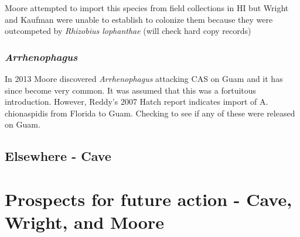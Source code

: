 \documentclass[12pt,letterpaper,english,bibliography=totocnumbered, abstract=on]{scrartcl}
\begin{document}
Moore attempted to import this species from field collections in HI but Wright and Kaufman were unable to establish to colonize them because they were outcompeted by \textit{Rhizobius lophanthae} (will check hard copy records)

\subsubsection{\textit{Arrhenophagus}} 

 In 2013 Moore discovered \textit{Arrhenophagus} attacking CAS on Guam and it has since become very common. It was assumed that this was a fortuitous introduction. However, Reddy's 2007 Hatch report indicates import of A. chionaspidis from Florida to Guam. Checking to see if any of these were released on Guam.

\subsection{Elsewhere - Cave}

\section{Prospects for future action - Cave, Wright, and Moore}

\newpage
\printbibliography[heading=bibintoc]
\end{document}
